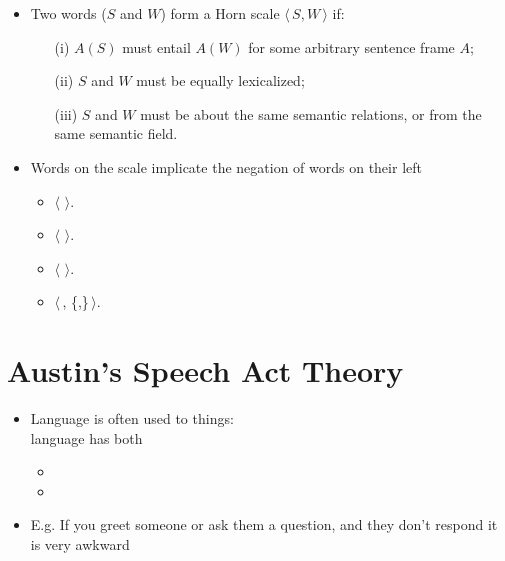 \documentclass[headrule,footrule]{foils}
\begin{document}
\newcommand{\horn}[1]{\ensuremath{\langle}\,#1\,\ensuremath{\rangle}}
\newcommand{\set}[1]{\{#1\}}
\begin{itemize}
\item Two words  ($S$ and $W$) form a Horn scale \horn{$S,W$} if: 
  \begin{enumerate}
  \item[(i)] $A(S)$ must entail $A(W)$ for some arbitrary sentence frame $A$;
  \item[(ii)] $S$ and $W$ must be equally lexicalized;
  \item[(iii)] $S$ and $W$ must be about the same semantic relations, or
    from the same semantic field. 
\end{enumerate}
\item Words on the scale implicate the negation of words on their left
  \begin{itemize}
  \item \horn{}.
  \item \horn{}.
  \item \horn{}.
  \item \horn{,  \set{,}}.
  \end{itemize}
\end{itemize}


\section{Austin's Speech Act Theory}

\begin{itemize}
\item Language is often used to  things: 
  \\ language has both
  \begin{itemize}
  \item {}
  \item {}
  \end{itemize}
\item E.g. If you greet someone or ask them a question, and they don't
  respond it is very awkward
\end{itemize}
\end{document}

